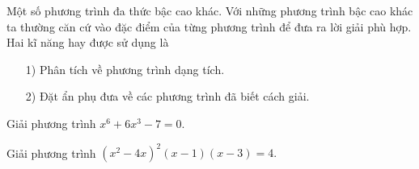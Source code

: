  
\begin{dang}{Một số phương trình đa thức bậc cao khác.}
    Với những phương trình bậc cao khác ta thường căn cứ vào đặc điểm của từng phương trình để đưa ra lời giải phù hợp. Hai kĩ năng hay được sử dụng là
    \begin{itemize}
    \item[1)] Phân tích về phương trình dạng tích.
    \item[2)] Đặt ẩn phụ đưa về các phương trình đã biết cách giải.
    \end{itemize}
\end{dang}


\begin{vd}%
        Giải phương trình $x^6+6x^3-7=0.$      
\end{vd}


\begin{vd}%
        Giải phương trình $(x^2-4x)^2(x-1)(x-3)=4.$      
\end{vd}

